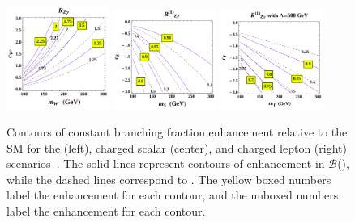 \begin{figure}[tb]
	\begin{center}
		\includegraphics[width=0.30\textwidth, height=.30\textwidth]{fig/theory/rzgamma_wprime.png}
		\includegraphics[width=0.30\textwidth, height=.30\textwidth]{fig/theory/rzgamma_scalar.png}
		\includegraphics[width=0.30\textwidth, height=.30\textwidth]{fig/theory/rzgamma_fermion.png}
		\caption[Contours of constant branching fraction enhancement relative to the SM for the \wprime{} (left), charged scalar (center), 
		and charged lepton (right) scenarios. 
		The solid lines represent contours of enhancement in $\mathcal{B}$(\hzg), while the dashed lines correspond to \hgg{}. The yellow boxed numbers label the enhancement for each 
		\hzg{} contour, and the unboxed numbers label the enhancement for each \hgg{} contour.]
		{Contours of constant branching fraction enhancement relative to the SM for the \wprime{} (left), charged scalar (center), 
		and charged lepton (right) scenarios~\cite{Zg_theory_decaywidth}. 
		The solid lines represent contours of enhancement in $\mathcal{B}$(\hzg), while the dashed lines correspond to \hgg{}. The yellow boxed numbers label the enhancement for each 
		\hzg{} contour, and the unboxed numbers label the enhancement for each \hgg{} contour.}
		\label{fig:rzg_bsm}
	\end{center}
\end{figure}

